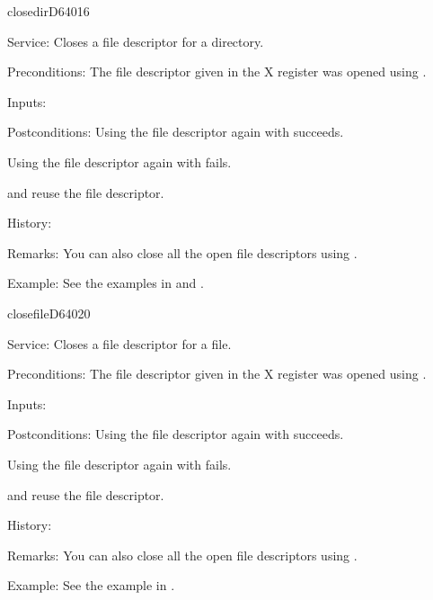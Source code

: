 \newpage
\begin{hyppotrap}{closedir}{D640}{16}
\item [Service:]
  Closes a file descriptor for a directory.
\item [Preconditions:]
  The file descriptor given in the X register was opened using
  .
\item [Inputs:]
\item [Postconditions:]
  Using the file descriptor again with  succeeds.

  Using the file descriptor again with  fails.

   and  reuse the file descriptor.
\item [History:]
\item [Remarks:]
  You can also close all the open file descriptors using .
\item [Example:]
  See the examples in  and .
\end{hyppotrap}


\newpage
\begin{hyppotrap}{closefile}{D640}{20}
\item [Service:]
  Closes a file descriptor for a file.
\item [Preconditions:]
  The file descriptor given in the X register was opened using
  .
\item [Inputs:]
\item [Postconditions:]
  Using the file descriptor again with  succeeds.

  Using the file descriptor again with  fails.

   and  reuse the file descriptor.
\item [History:]
\item [Remarks:]
  You can also close all the open file descriptors using .
\item [Example:]
  See the example in .
\end{hyppotrap}



